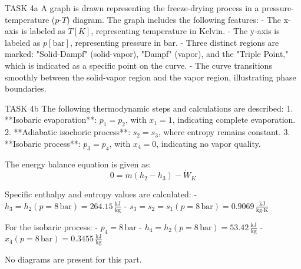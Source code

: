 TASK 4a  
A graph is drawn representing the freeze-drying process in a pressure-temperature (\(p\)-\(T\)) diagram. The graph includes the following features:  
- The x-axis is labeled as \(T [K]\), representing temperature in Kelvin.  
- The y-axis is labeled as \(p [\text{bar}]\), representing pressure in bar.  
- Three distinct regions are marked: "Solid-Dampf" (solid-vapor), "Dampf" (vapor), and the "Triple Point," which is indicated as a specific point on the curve.  
- The curve transitions smoothly between the solid-vapor region and the vapor region, illustrating phase boundaries.  

TASK 4b  
The following thermodynamic steps and calculations are described:  
1. **Isobaric evaporation**: \(p_1 = p_2\), with \(x_1 = 1\), indicating complete evaporation.  
2. **Adiabatic isochoric process**: \(s_2 = s_3\), where entropy remains constant.  
3. **Isobaric process**: \(p_3 = p_4\), with \(x_4 = 0\), indicating no vapor quality.  

The energy balance equation is given as:  
\[
0 = \dot{m} (h_2 - h_3) - \dot{W}_K
\]  

Specific enthalpy and entropy values are calculated:  
- \(h_3 = h_2(p = 8 \, \text{bar}) = 264.15 \, \frac{\text{kJ}}{\text{kg}}\)  
- \(s_3 = s_2 = s_1(p = 8 \, \text{bar}) = 0.9069 \, \frac{\text{kJ}}{\text{kg·K}}\)  

For the isobaric process:  
- \(p_4 = 8 \, \text{bar}\)  
- \(h_4 = h_2(p = 8 \, \text{bar}) = 53.42 \, \frac{\text{kJ}}{\text{kg}}\)  
- \(x_4(p = 8 \, \text{bar}) = 0.3455 \, \frac{\text{kJ}}{\text{kg}}\)  

No diagrams are present for this part.